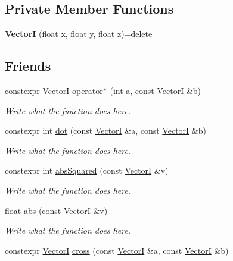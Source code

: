 \subsection*{Private Member Functions}
\begin{DoxyCompactItemize}
\item 
\hypertarget{structVectorI_a391ea795b68954ca116d9529bcd777d5}{{\bfseries Vector\+I} (float x, float y, float z)=delete}\label{structVectorI_a391ea795b68954ca116d9529bcd777d5}

\end{DoxyCompactItemize}
\subsection*{Friends}
\begin{DoxyCompactItemize}
\item 
constexpr \hyperlink{structVectorI}{Vector\+I} \hyperlink{structVectorI_a8ca1871ee915261bf5f209bf34845352}{operator$\ast$} (int a, const \hyperlink{structVectorI}{Vector\+I} \&b)
\begin{DoxyCompactList}\small\item\em Write what the function does here. \end{DoxyCompactList}\item 
constexpr int \hyperlink{structVectorI_a10071232f1e09cba9bc0d5cd6f1682e1}{dot} (const \hyperlink{structVectorI}{Vector\+I} \&a, const \hyperlink{structVectorI}{Vector\+I} \&b)
\begin{DoxyCompactList}\small\item\em Write what the function does here. \end{DoxyCompactList}\item 
constexpr int \hyperlink{structVectorI_aad5ba75ce5b6abf929b2d0ae10cb20ba}{abs\+Squared} (const \hyperlink{structVectorI}{Vector\+I} \&v)
\begin{DoxyCompactList}\small\item\em Write what the function does here. \end{DoxyCompactList}\item 
float \hyperlink{structVectorI_a51fa10de94ee70191edbc9d465d4ccc3}{abs} (const \hyperlink{structVectorI}{Vector\+I} \&v)
\begin{DoxyCompactList}\small\item\em Write what the function does here. \end{DoxyCompactList}\item 
constexpr \hyperlink{structVectorI}{Vector\+I} \hyperlink{structVectorI_a0f0203ee67ee2450caf3f94e13e9af53}{cross} (const \hyperlink{structVectorI}{Vector\+I} \&a, const \hyperlink{structVectorI}{Vector\+I} \&b)

\end{DoxyCompactItemize}

